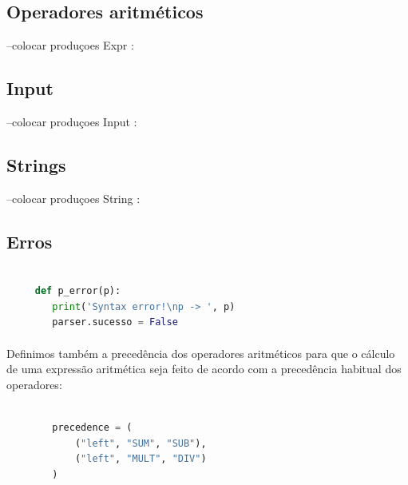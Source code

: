 \documentclass[11pt,a4paper]{report}
\begin{document}
    \paragraph{}
    \subsection{Operadores aritméticos}
       --colocar produçoes Expr :

    \paragraph{}
    \subsection{Input}
       --colocar produçoes Input :

    \paragraph{}
    \subsection{Strings}
       --colocar produçoes String :

    \paragraph{}
    \subsection{Erros}
    \begin{lstlisting}[language=Python]
    
     def p_error(p):
        print('Syntax error!\np -> ', p)
        parser.sucesso = False
    \end{lstlisting}

    \paragraph{}
    Definimos também a precedência dos operadores aritméticos para que o cálculo de uma expressão aritmética seja feito de acordo com a precedência habitual dos operadores:
    \begin{lstlisting}[language=Python]
    
        precedence = (
            ("left", "SUM", "SUB"),
            ("left", "MULT", "DIV")
        )
  
    \end{lstlisting}
    
\end{document}
